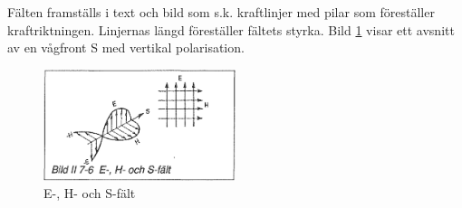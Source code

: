 Fälten framställs i text och bild som s.k.  kraftlinjer med pilar som
föreställer kraftriktningen. Linjernas längd föreställer fältets
styrka. Bild \ref{fig:BildII7-06} visar ett avsnitt av en vågfront S med vertikal
polarisation.

\begin{figure}
\includegraphics[width=0.5\textwidth]{images/bild_2_7-06}
\caption{E-, H- och S-fält}
\label{fig:BildII7-06}
\end{figure}
